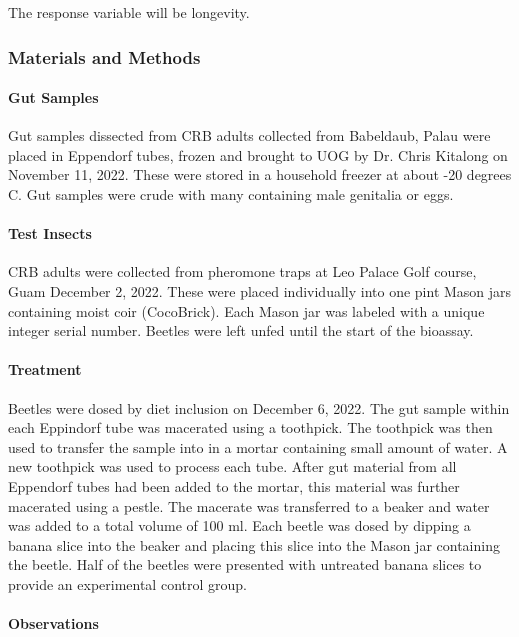 \documentclass[12pt,letterpaper,english,bibliography=totocnumbered, abstract=on]{scrartcl}
\begin{document}
The response variable will be longevity.

\subsubsection{Materials and Methods}

\paragraph{Gut Samples}
Gut samples dissected from CRB adults collected from Babeldaub, Palau were placed in Eppendorf tubes, frozen and brought to UOG by Dr. Chris Kitalong on November 11, 2022. These were stored in a household freezer at about -20 degrees C. Gut samples were crude with many containing male genitalia or eggs.

\paragraph{Test Insects}
CRB adults were collected from pheromone traps at Leo Palace Golf course, Guam December 2, 2022. These were placed individually into one pint Mason jars containing moist coir (CocoBrick). Each Mason jar was labeled with a unique integer serial number. Beetles were left unfed until the start of the bioassay.

\paragraph{Treatment}

Beetles were dosed by diet inclusion on December 6, 2022.  The gut sample within each Eppindorf tube was macerated using a toothpick. 
The toothpick was then used to transfer the sample into in a mortar containing small amount of water. A new toothpick was used to process each tube. After gut material from all Eppendorf tubes had been added to the mortar, this material was further macerated using a pestle. The macerate was transferred to a beaker and water was added to a total volume of 100 ml. Each beetle was dosed by dipping a banana slice into the beaker and placing this slice into the Mason jar containing the beetle. Half of the beetles were presented with untreated banana slices to provide an experimental control group. 

\paragraph{Observations}
\end{document}
